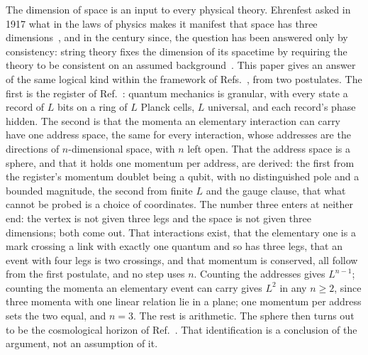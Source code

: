 \documentclass[aps,prd,twocolumn,superscriptaddress,nofootinbib]{revtex4-2}
\begin{document}
The dimension of space is an input to every physical theory. Ehrenfest asked in 1917 what in the laws of physics makes it manifest that space has three dimensions~\cite{ehrenfest1917}, and in the century since, the question has been answered only by consistency: string theory fixes the dimension of its spacetime by requiring the theory to be consistent on an assumed background~\cite{lovelace1971,goddard1972}. This paper gives an answer of the same logical kind within the framework of Refs.~\cite{korytko2026,korytko2026b,korytko2026c}, from two postulates. The first is the register of Ref.~\cite{korytko2026c}: quantum mechanics is granular, with every state a record of $L$ bits on a ring of $L$ Planck cells, $L$ universal, and each record's phase hidden. The second is that the momenta an elementary interaction can carry have one address space, the same for every interaction, whose addresses are the directions of $n$-dimensional space, with $n$ left open. That the address space is a sphere, and that it holds one momentum per address, are derived: the first from the register's momentum doublet being a qubit, with no distinguished pole and a bounded magnitude, the second from finite $L$ and the gauge clause, that what cannot be probed is a choice of coordinates. The number three enters at neither end: the vertex is not given three legs and the space is not given three dimensions; both come out. That interactions exist, that the elementary one is a mark crossing a link with exactly one quantum and so has three legs, that an event with four legs is two crossings, and that momentum is conserved, all follow from the first postulate, and no step uses $n$. Counting the addresses gives $L^{n-1}$; counting the momenta an elementary event can carry gives $L^2$ in any $n \ge 2$, since three momenta with one linear relation lie in a plane; one momentum per address sets the two equal, and $n = 3$. The rest is arithmetic. The sphere then turns out to be the cosmological horizon of Ref.~\cite{korytko2026}. That identification is a conclusion of the argument, not an assumption of it.
\end{document}
